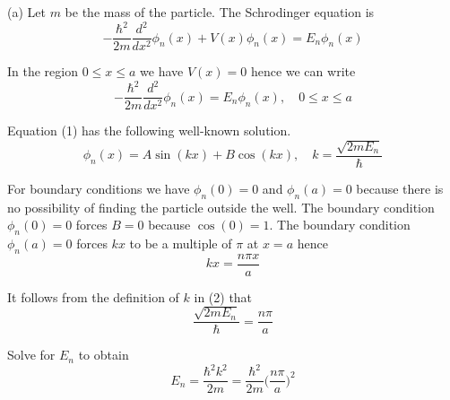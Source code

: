


\bigskip
(a) Let $m$ be the mass of the particle.
The Schrodinger equation is
\begin{equation*}
-\frac{\hbar^2}{2m}\frac{d^2}{dx^2}\phi_n(x)+V(x)\phi_n(x)=E_n\phi_n(x)
\end{equation*}

In the region $0\le x\le a$ we have $V(x)=0$ hence we can write
\begin{equation*}
-\frac{\hbar^2}{2m}\frac{d^2}{dx^2}\phi_n(x)=E_n\phi_n(x),
\quad
0\le x\le a
\tag{1}
\end{equation*}

Equation (1) has the following well-known solution.
\begin{equation*}
\phi_n(x)=A\sin(kx)+B\cos(kx),
\quad
k=\frac{\sqrt{2mE_n}}{\hbar}
\tag{2}
\end{equation*}

For boundary conditions we have $\phi_n(0)=0$ and $\phi_n(a)=0$ because
there is no possibility of finding the particle outside the well.
The boundary condition $\phi_n(0)=0$ forces $B=0$ because $\cos(0)=1$.
The boundary condition $\phi_n(a)=0$ forces $kx$ to be a multiple of $\pi$ at $x=a$ hence
\begin{equation*}
kx=\frac{n\pi x}{a}
\end{equation*}

It follows from the definition of $k$ in (2) that
\begin{equation*}
\frac{\sqrt{2mE_n}}{\hbar}=\frac{n\pi}{a}
\end{equation*}

Solve for $E_n$ to obtain
\begin{equation*}
E_n=\frac{\hbar^2k^2}{2m}=\frac{\hbar^2}{2m}\bigg(\frac{n\pi}{a}\bigg)^2
\end{equation*}

